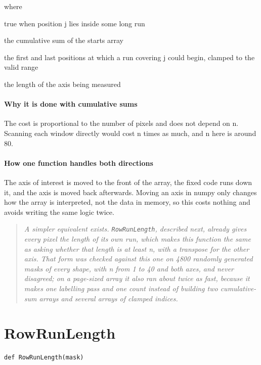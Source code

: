 \noindent where
\begin{description}[leftmargin=2.4em,style=nextline,font=\normalfont\ttfamily]\setlength\itemsep{1pt}
  \item[{$\mathrm{covered}[j]$}] \normalfont true when position j lies inside some long run
  \item[{$cs$}] \normalfont the cumulative sum of the starts array
  \item[{$l_j, h_j$}] \normalfont the first and last positions at which a run covering j could begin, clamped to the valid range
  \item[{$L$}] \normalfont the length of the axis being measured
\end{description}

\paragraph{Why it is done with cumulative sums}
The cost is proportional to the number of pixels and does not depend on n. Scanning each window directly would cost n times as much, and n here is around 80.


\paragraph{How one function handles both directions}
The axis of interest is moved to the front of the array, the fixed code runs down it, and the axis is moved back afterwards. Moving an axis in numpy only changes how the array is interpreted, not the data in memory, so this costs nothing and avoids writing the same logic twice.


\begin{quote}\small\itshape A simpler equivalent exists. \texttt{RowRunLength}, described next, already gives every pixel the length of its own run, which makes this function the same as asking whether that length is at least n, with a transpose for the other axis. That form was checked against this one on 4800 randomly generated masks of every shape, with n from 1 to 40 and both axes, and never disagreed; on a page-sized array it also ran about twice as fast, because it makes one labelling pass and one count instead of building two cumulative-sum arrays and several arrays of clamped indices.\end{quote}

\section{RowRunLength}
\begin{lstlisting}[style=sig]
def RowRunLength(mask)
\end{lstlisting}

